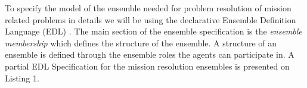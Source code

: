 \documentclass[journal]{IEEEtran}
\theoremstyle{definition}
\newtheorem{definition}{Definition}
\newcommand\patrizio[1]{\nb{Patrizio}{#1}}
\begin{document}








 
 





 

 
 
 


To specify the model of the ensemble needed for problem resolution of mission related problems in details we will be  using the declarative Ensemble
Definition Language (EDL) \cite{bures2015towards}.
The main section of the ensemble specification is
the \textit{ensemble membership} which defines the
structure of the ensemble.
A structure of an ensemble is defined through the ensemble
roles the agents can participate in. A partial EDL Specification for the mission resolution ensembles is presented on Listing 1.
\end{document}
